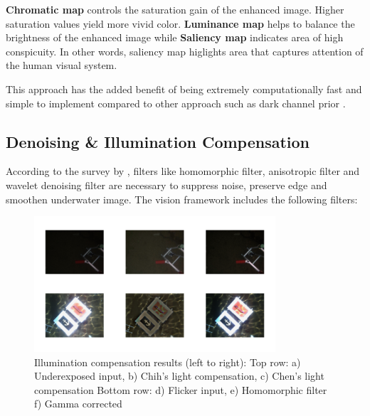 \documentclass[hyp]{socreport}
\begin{document}
\textbf{Chromatic map} controls the saturation gain of the enhanced image.
Higher saturation values yield more vivid color. \textbf{Luminance map} helps to
balance the brightness of the enhanced image while \textbf{Saliency map}
indicates area of high conspicuity. In other words, saliency map higlights area
that captures attention of the human visual system.

This approach has the added benefit of being extremely computationally fast and
simple to implement compared to other approach such as dark channel prior .

\subsection{Denoising \& Illumination Compensation}

According to the survey by , filters like
homomorphic filter, anisotropic filter and wavelet denoising filter are
necessary to suppress noise, preserve edge and smoothen underwater image. The
vision framework includes the following filters:

\begin{figure}[H]
\centering
  \includegraphics[width=0.8\textwidth, height=0.3\textheight]{illumination_compensation.png}
  \caption{Illumination compensation results (left to right): \newline Top row:
  a) Underexposed input, b) Chih's light compensation, c) Chen's light compensation \newline Bottom
  row: d) Flicker input, e) Homomorphic filter f) Gamma corrected}
  \label{fig:illumination_compensation_results}
\end{figure}
\end{document}

